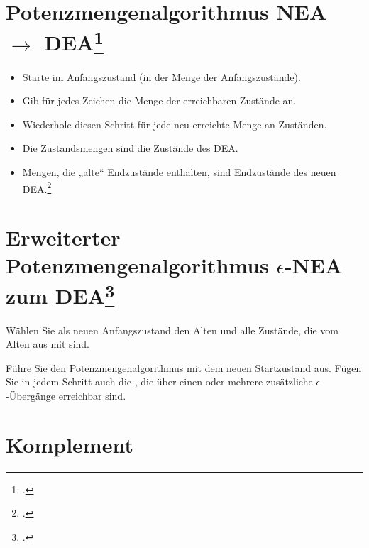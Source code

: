 \documentclass{lehramt-informatik-haupt}
\begin{document}

%

\section{Potenzmengenalgorithmus NEA $\rightarrow$ DEA\footcite[Seite 35-47]{theo:fs:1}}

\begin{itemize}
\item Starte im Anfangszustand (in der Menge der Anfangszustände).

\item Gib für jedes Zeichen die Menge der erreichbaren Zustände an.

\item Wiederhole diesen Schritt für jede neu erreichte Menge an
Zuständen.

\item Die Zustandsmengen sind die Zustände des DEA.

\item Mengen, die „alte“ Endzustände enthalten, sind Endzustände des
neuen DEA.\footcite{wiki:potenzmengenkonstruktion}
\end{itemize}

%

\section{Erweiterter Potenzmengenalgorithmus $\epsilon$-NEA zum
DEA\footcite[Seite 48-49]{theo:fs:1}}

Wählen Sie als neuen Anfangszustand den Alten und alle Zustände, die vom
Alten aus mit  sind.

Führe Sie den Potenzmengenalgorithmus mit dem neuen Startzustand aus.
Fügen Sie in jedem Schritt auch die , die über
einen oder mehrere zusätzliche $\epsilon$-Übergänge erreichbar sind.

\section{Komplement}
\end{document}
